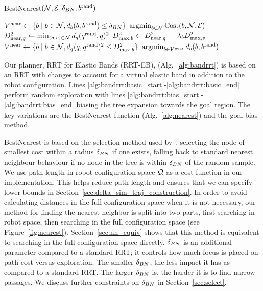 \begin{algorithm}[t]
\caption{BestNearest$(\mathcal{N}, \mathcal{E}, \delta_{BN}, b^\textrm{rand})$}
\begin{algorithmic}[1]
    \State $V^{\textrm{near}} \gets \{ b \mid b \in \mathcal{N}, d_b(b, b^\textrm{rand}) \leq \delta_{BN} \}$
    \If {$\Pstatenear \neq \emptyset$}
        \State \Return $\operatorname*{argmin}_{b \in \mathcal{N}} \textrm{Cost}(b, \mathcal{N}, \mathcal{E})$
    \Else
        \State $D_{\textrm{near},q}^2 \gets \min_{(q, v) \in \mathcal{N}}{d_q(q^\textrm{rand}, q)^2}$ \label{alg:nearst:robotspace}
        \State $D_{\textrm{max},b}^2 \gets D_{\textrm{near},q}^2\ + \lambda_b D_{\textrm{max},v}^2$
        \State $V^{\textrm{near}} \gets \{ b \mid b \in \mathcal{N}, d_q(q, q^\textrm{rand})^2 \leq D_{\textrm{max},b}^2 \}$ \label{alg:nearest:radius}
        \State \Return $\operatorname*{argmin}_{b \in V^{\textrm{near}}}{d_b(b, b^\textrm{rand})}$ \label{alg:nearest:fullspace}
    \EndIf
\end{algorithmic}
\label{alg:nearest}
\end{algorithm}

Our planner, RRT for Elastic Bands (RRT-EB), (Alg.~\ref{alg:bandrrt}) is based on an RRT with changes to account for a virtual elastic band in addition to the robot configuration. Lines \ref{alg:bandrrt:basic_start}-\ref{alg:bandrrt:basic_end} perform random exploration with lines \ref{alg:bandrrt:bias_start}-\ref{alg:bandrrt:bias_end} biasing the tree expansion towards the goal region. The key variations are the BestNearest function (Alg.~\ref{alg:nearest}) and the goal bias method.

BestNearest is based on the selection method used by~\cite{LiAOKP2016}, selecting the node of smallest cost within a radius $\delta_{BN}$ if one exists, falling back to standard nearest neighbour behaviour if no node in the tree is within $\delta_{BN}$ of the random sample. We use path length in robot configuration space $\mathcal{Q}$ as a cost function in our implementation. This helps reduce path length and ensures that we can specify lower bounds in Section~\ref{sec:delta_sim_traj_construction}. In order to avoid calculating distances in the full configuration space when it is not necessary, our method for finding the nearest neighbor is split into two parts, first searching in robot space, then searching in the full configuration space (see Figure~\ref{fig:nearest}). Section~\ref{sec:nn_equiv} shows that this method is equivalent to searching in the full configuration space directly. $\delta_{BN}$ is an additional parameter compared to a standard RRT; it controls how much focus is placed on path cost versus exploration. The smaller $\delta_{BN}$, the less impact it has as compared to a standard RRT.  The larger $\delta_{BN}$ is, the harder it is to find narrow passages. We discuss further constraints on $\delta_{BN}$ in Section~\ref{sec:select}.


